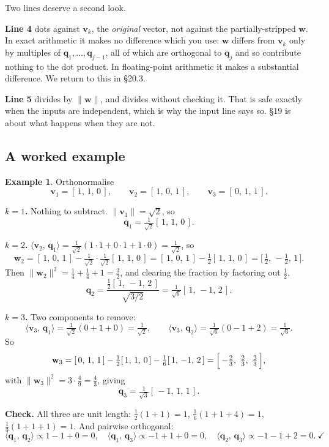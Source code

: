 \documentclass[11pt]{article}
\theoremstyle{plain}
\theoremstyle{definition}
\newtheorem{ex}{Example}[section]
\theoremstyle{remark}
\newcommand{\vc}[1]{\mathbf{#1}}
\newcommand{\norm}[1]{\lVert #1\rVert}
\newcommand{\ip}[2]{\langle #1,\, #2\rangle}
\begin{document}
\noindent Two lines deserve a second look.

\textbf{Line 4} dots against $\vc{v}_{k}$, the \emph{original} vector, not
against the partially-stripped $\vc{w}$. In exact arithmetic it makes no
difference which you use: $\vc{w}$ differs from $\vc{v}_{k}$ only by multiples
of $\vc{q}_{1},\dots,\vc{q}_{j-1}$, all of which are orthogonal to $\vc{q}_{j}$
and so contribute nothing to the dot product. In floating-point arithmetic it
makes a substantial difference. We return to this in \S20.3.

\textbf{Line 5} divides by $\norm{\vc{w}}$, and divides without checking it. That
is safe exactly when the inputs are independent, which is why the input line
says so. \S19 is about what happens when they are not.

\subsection{A worked example}
\begin{ex}
Orthonormalise
\[
  \vc{v}_{1}=[\,1,\,1,\,0\,],\qquad
  \vc{v}_{2}=[\,1,\,0,\,1\,],\qquad
  \vc{v}_{3}=[\,0,\,1,\,1\,] .
\]

\smallskip
\noindent\textbf{$k=1$.} Nothing to subtract. $\norm{\vc{v}_{1}}=\sqrt{2}$, so
\[
  \vc{q}_{1}=\tfrac{1}{\sqrt{2}}[\,1,\,1,\,0\,] .
\]

\smallskip
\noindent\textbf{$k=2$.}
$\ip{\vc{v}_{2}}{\vc{q}_{1}}=\tfrac{1}{\sqrt2}(1\cdot1+0\cdot1+1\cdot0)
=\tfrac{1}{\sqrt2}$, so
\[
  \vc{w}_{2}=[\,1,\,0,\,1\,]-\tfrac{1}{\sqrt2}\cdot\tfrac{1}{\sqrt2}[\,1,\,1,\,0\,]
            =[\,1,\,0,\,1\,]-\tfrac12[\,1,\,1,\,0\,]
            =\bigl[\,\tfrac12,\,-\tfrac12,\,1\,\bigr] .
\]
Then $\norm{\vc{w}_{2}}^{2}=\tfrac14+\tfrac14+1=\tfrac32$, and clearing the
fraction by factoring out $\tfrac12$,
\[
  \vc{q}_{2}=\frac{\tfrac12[\,1,\,-1,\,2\,]}{\sqrt{3/2}}
            =\tfrac{1}{\sqrt{6}}[\,1,\,-1,\,2\,] .
\]

\smallskip
\noindent\textbf{$k=3$.} Two components to remove:
\[
  \ip{\vc{v}_{3}}{\vc{q}_{1}}=\tfrac{1}{\sqrt2}(0+1+0)=\tfrac{1}{\sqrt2},
  \qquad
  \ip{\vc{v}_{3}}{\vc{q}_{2}}=\tfrac{1}{\sqrt6}(0-1+2)=\tfrac{1}{\sqrt6} .
\]
So
\[
  \vc{w}_{3}=[\,0,\,1,\,1\,]-\tfrac12[\,1,\,1,\,0\,]-\tfrac16[\,1,\,-1,\,2\,]
            =\Bigl[\,-\tfrac23,\ \tfrac23,\ \tfrac23\,\Bigr],
\]
with $\norm{\vc{w}_{3}}^{2}=3\cdot\tfrac49=\tfrac43$, giving
\[
  \vc{q}_{3}=\tfrac{1}{\sqrt{3}}[\,-1,\,1,\,1\,] .
\]

\smallskip
\noindent\textbf{Check.} All three are unit length:
$\tfrac12(1+1)=1$, $\tfrac16(1+1+4)=1$, $\tfrac13(1+1+1)=1$. And pairwise
orthogonal:
\[
  \ip{\vc{q}_{1}}{\vc{q}_{2}}\propto 1-1+0=0,\quad
  \ip{\vc{q}_{1}}{\vc{q}_{3}}\propto -1+1+0=0,\quad
  \ip{\vc{q}_{2}}{\vc{q}_{3}}\propto -1-1+2=0 .\ \checkmark
\]
\end{ex}
\end{document}
